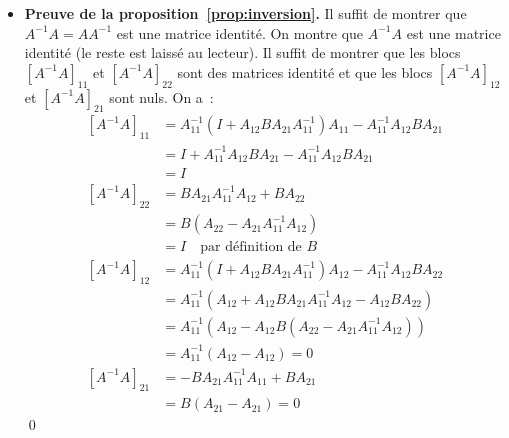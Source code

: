 \documentclass[10pt]{beamer}
\begin{document}
\begin{notes}

  \begin{itemize}

  \item \textbf{Preuve de la proposition~\ref{prop:inversion}.} Il suffit de montrer que $A^{-1}A = AA^{-1}$ est une matrice identité. On montre que $A^{-1}A$ est une matrice identité (le reste est laissé au lecteur). Il suffit de montrer que les blocs $\left[ A^{-1}A \right]_{11}$ et $\left[ A^{-1}A \right]_{22}$ sont des matrices identité et que les blocs $\left[ A^{-1}A \right]_{12}$ et $\left[ A^{-1}A \right]_{21}$ sont nuls. On a~:
    \[
      \begin{split}
        \left[A^{-1}A\right]_{11} &= A_{11}^{-1}\left( I + A_{12}BA_{21}A_{11}^{-1} \right)A_{11}-A_{11}^{-1}A_{12}BA_{21}\\
                                  &= I + A_{11}^{-1}A_{12}BA_{21}-A_{11}^{-1}A_{12}BA_{21}\\
                                  &= I\\
        \left[ A^{-1}A \right]_{22} &= BA_{21}A_{11}^{-1}A_{12}+BA_{22}\\
                                  &= B\left( A_{22}- A_{21}A_{11}^{-1}A_{12}\right)\\
                                  &= I\quad\text{par définition de }B\\
        \left[ A^{-1}A \right]_{12} &= A_{11}^{-1}\left( I + A_{12}BA_{21}A_{11}^{-1} \right)A_{12} - A_{11}^{-1}A_{12}BA_{22}\\
                                  &= A_{11}^{-1}\left( A_{12} + A_{12}BA_{21}A_{11}^{-1}A_{12} - A_{12} B A_{22}  \right)\\
                                  &= A_{11}^{-1}\left( A_{12} - A_{12}B \left(A_{22}- A_{21}A_{11}^{-1}A_{12} \right) \right)\\
                                  &= A_{11}^{-1}\left( A_{12} - A_{12}\right) = 0\\
        \left[A^{-1}A\right]_{21} &= -BA_{21}A_{11}^{-1}A_{11}+BA_{21}\\
                                  &= B\left( A_{21}- A_{21}\right) = 0
      \end{split}
    \]
    \qed
  \end{itemize}

\end{notes}
\end{document}
